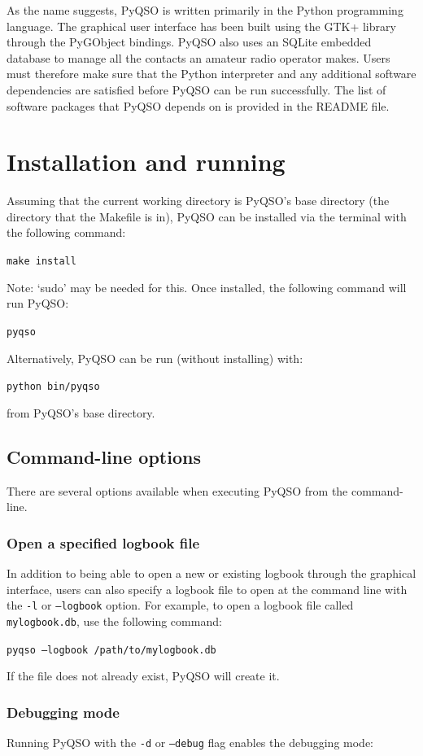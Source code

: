 \documentclass[11pt, a4paper]{report}
\begin{document}
As the name suggests, PyQSO is written primarily in the Python programming language. The graphical user interface has been built using the GTK+ library through the PyGObject bindings. PyQSO also uses an SQLite embedded database to manage all the contacts an amateur radio operator makes. Users must therefore make sure that the Python interpreter and any additional software dependencies are satisfied before PyQSO can be run successfully. The list of software packages that PyQSO depends on is provided in the README file.

\section{Installation and running}
Assuming that the current working directory is PyQSO's base directory (the directory that the Makefile is in), PyQSO can be installed via the terminal with the following command:

  \texttt{make install}

\noindent Note: `sudo' may be needed for this. Once installed, the following command will run PyQSO:

  \texttt{pyqso}

\noindent Alternatively, PyQSO can be run (without installing) with:

  \texttt{python bin/pyqso}

\noindent from PyQSO's base directory.

\subsection{Command-line options}
There are several options available when executing PyQSO from the command-line.

\subsubsection{Open a specified logbook file}
In addition to being able to open a new or existing logbook through the graphical interface, users can also specify a logbook file to open at the command line with the \texttt{-l} or \texttt{--logbook} option. For example, to open a logbook file called \texttt{mylogbook.db}, use the following command:

  \texttt{pyqso --logbook /path/to/mylogbook.db}

\noindent If the file does not already exist, PyQSO will create it.

\subsubsection{Debugging mode}
Running PyQSO with the \texttt{-d} or \texttt{--debug} flag enables the debugging mode:
\end{document}
